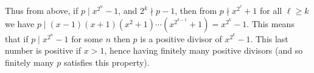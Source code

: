 \documentclass[11pt,a4paper]{article}
\begin{document}
\begin{enumerate}
	Thus from above, if $p\mid x^{2^n}-1$, and $2^{k}\nmid p-1$, then from $p\nmid x^{2^\ell}+1$ for all $\ell\ge k$ we have $p\mid (x-1)(x+1)(x^2+1)\cdots (x^{2^{k-1}}+1) = x^{2^k}-1$. 
	This means that if $p\mid x^{2^n}-1$ for some $n$ then $p$ is a positive divisor of $x^{2^k}-1$. This last number is positive if $x>1$, hence having finitely many positive divisors (and so finitely many $p$ satisfies this property). 
	
\end{enumerate}
\end{document}
